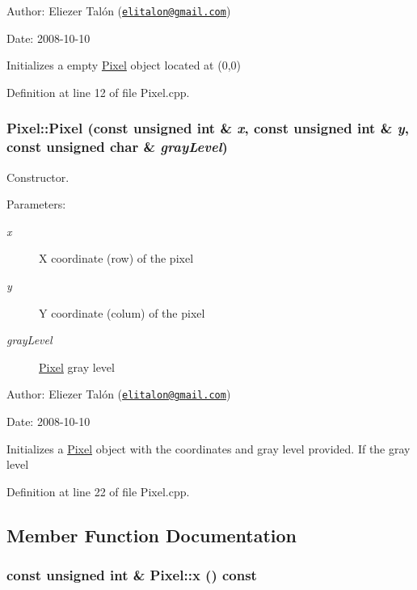 \begin{Desc}
\item[Author:]Eliezer Talón (\href{mailto:elitalon@gmail.com}{\tt elitalon@gmail.com}) \end{Desc}
\begin{Desc}
\item[Date:]2008-10-10\end{Desc}
Initializes a empty \hyperlink{class_pixel}{Pixel} object located at (0,0) 

Definition at line 12 of file Pixel.cpp.\hypertarget{class_pixel_31103b6b7b52712789d1fdab7ab7ce29}{
\subsubsection[Pixel]{\setlength{\rightskip}{0pt plus 5cm}Pixel::Pixel (const unsigned int \& {\em x}, \/  const unsigned int \& {\em y}, \/  const unsigned char \& {\em grayLevel})}}
\label{class_pixel_31103b6b7b52712789d1fdab7ab7ce29}


Constructor. 

\begin{Desc}
\item[Parameters:]
\begin{description}
\item[{\em x}]X coordinate (row) of the pixel \item[{\em y}]Y coordinate (colum) of the pixel \item[{\em grayLevel}]\hyperlink{class_pixel}{Pixel} gray level\end{description}
\end{Desc}
\begin{Desc}
\item[Author:]Eliezer Talón (\href{mailto:elitalon@gmail.com}{\tt elitalon@gmail.com}) \end{Desc}
\begin{Desc}
\item[Date:]2008-10-10\end{Desc}
Initializes a \hyperlink{class_pixel}{Pixel} object with the coordinates and gray level provided. If the gray level 

Definition at line 22 of file Pixel.cpp.

\subsection{Member Function Documentation}
\hypertarget{class_pixel_526b7e40e1d376dcf0a48dc909d23221}{
\subsubsection[x]{\setlength{\rightskip}{0pt plus 5cm}const unsigned int \& Pixel::x () const}}
\label{class_pixel_526b7e40e1d376dcf0a48dc909d23221}


